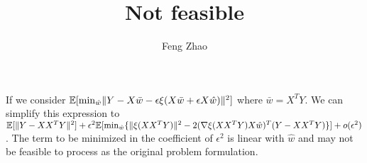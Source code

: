\documentclass{article}
\title{Not feasible}
\author{Feng Zhao}
\DeclarePairedDelimiter\norm{\lVert}{\rVert}
\def\E{\mathbb{E}}
\begin{document}
\maketitle
If we consider $\E[\min_{\hat{w}}\norm{Y - X \bar{w} - \epsilon \xi (X \bar{w} + \epsilon X \hat{w})}^2]$ where 
$\bar{w} = X^T Y$. We can simplify this expression to
$\E[\norm{Y-XX^TY}^2] + \epsilon^2 \E[\min_{\hat{w}}\{\norm{\xi(XX^TY)}^2 - 2(\nabla \xi(XX^TY) X\hat{w})^T(Y-XX^TY)\}] + o(\epsilon^2)$. The term to be minimized in the coefficient of $\epsilon^2$ is linear with $\hat{w}$ and may not be feasible to process as the original problem formulation.
\end{document}
